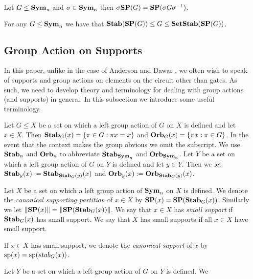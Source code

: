 \documentclass[../paper.tex]{subfiles}
\begin{document}
\begin{lem}
  \label{lem:SP_conjugation}
  Let $G \leq \text{\textbf{Sym}}_n$ and $\sigma \in \text{\textbf{Sym}}_n$ then $\sigma \text{\textbf{SP}} (G) = \text{\textbf{SP}}(\sigma
  G \sigma^{-1})$.
\end{lem}

\begin{lem}
  For any $G \leq \text{\textbf{Sym}}_n$ we have that $\text{\textbf{Stab}} (\text{\textbf{SP}} (G)) \leq G \leq
  \text{\textbf{SetStab}}(\text{\textbf{SP}}(G))$.
\end{lem}

\subsection{Group Action on Supports}
In this paper, unlike in the case of Anderson and Dawar \cite{AndersonD17}, we
often wish to speak of supports and group actions on elements on the circuit
other than gates. As such, we need to develop theory and terminology for dealing
with group actions (and supports) in general. In this subsection we introduce
some useful terminology.

\begin{definition}
  Let $G \leq X$ be a set on which a left group action of $G$ on $X$ is defined
  and let $x \in X$. Then $\text{\textbf{Stab}}_G (x) = \{\pi \in G : \pi x = x\}$ and $\text{\textbf{Orb}}_G
  (x) = \{\pi x : \pi \in G\}$. In the event that the context makes the group
  obvious we omit the subscript. We use $\text{\textbf{Stab}}_n$ and $\text{\textbf{Orb}}_n$ to abbreviate
  $\text{\textbf{Stab}}_{\text{\textbf{Sym}}_n}$ and $\text{\textbf{Orb}}_{\text{\textbf{Sym}}_n}$. Let $Y$ be a set on which a left group
  action of $G$ on $Y$ is defined and let $y \in Y$. Then we let $\text{\textbf{Stab}}_y(x) :=
  \text{\textbf{Stab}}_{\text{\textbf{Stab}}_G(y)}(x)$ and $\text{\textbf{Orb}}_y(x) := \text{\textbf{Orb}}_{\text{\textbf{Stab}}_{G}(y)}(x)$.
\end{definition}

\begin{definition}
  Let $X$ be a set on which a left group action of $\text{\textbf{Sym}}_n$ on
  $X$ is defined. We denote the \emph{canonical supporting partition} of $x \in
  X$ by $\text{\textbf{SP}} (x) = \text{\textbf{SP}} (\text{\textbf{Stab}}_G(x))$. Similarly we let $\| \text{\textbf{SP}} (x) \| = \| \text{\textbf{SP}}
  (\text{\textbf{Stab}}_G(x)) \|$. We say that $x \in X$ has \emph{small support} if
  $\text{\textbf{Stab}}_G(x)$ has small support. We say that $X$ has small supports if all $x
  \in X$ have small support.

  If $x \in X$ has small support, we denote the \emph{canonical support} of $x$
  by $\text{sp}(x) = \text{sp} (stab_G(x))$.

  Let $Y$ be a set on which a left group action of $G$ on $Y$ is defined. We 
\end{definition}
\end{document}
